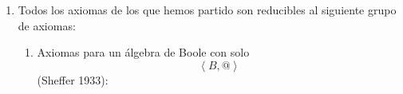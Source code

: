 \documentclass[
]{article}
\begin{document}
\begin{enumerate}
\begin{enumerate}
\begin{enumerate}
\begin{enumerate}
        \[{= {{({{({{({x + y})} + z})} + \overline{x}})} \cdot {({{({{({{({x + y})} + z})} + \overline{y}})} \cdot 1})}}} =\]

        \[{= {{({{({{({x + y})} + z})} + \overline{x}})} \cdot {({{({{({x + y})} + z})} + \overline{y}})}}} =\]

        \[{= {{({{({x + y})} + z})} + {({\overline{x} \cdot \overline{y}})}}} =\]

        \[{= {{({{({x + y})} + z})} + \overline{({x+y})}}} =\]

        \[{= {\overline{({x+y})} + {({{({x + y})} + z})}}} =\]

        \[= 1\]
      \item
        \[\mathit{De}{\lbrack\mathbf{1}\rbrack}y\mathit{de}{\lbrack\mathbf{2}\rbrack}\mathit{obtenemos}\mathit{que}{\overline{a} = \overline{b}}\Rightarrow{a = b}\]
      \end{enumerate}
    \item
      Todos los axiomas de los que hemos partido son reducibles al
      siguiente grupo de axiomas:

      \begin{enumerate}
      \def\labelenumiv{\arabic{enumiv}.}
      \item
        Axiomas para un álgebra de Boole con
        solo\[\left\langle {B,@} \right\rangle\](Sheffer 1933):


\end{enumerate}
\end{enumerate}
\end{enumerate}
\end{enumerate}
\end{document}
